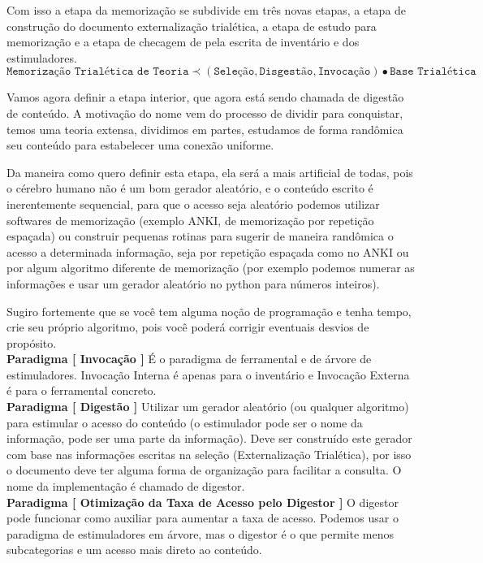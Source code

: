 Com isso a etapa da memorização se subdivide em três novas etapas, a etapa de construção do documento externalização trialética, a etapa de estudo para memorização e a etapa de checagem de pela escrita de inventário e dos estimuladores.
$$ \texttt{Memorização Trialética de Teoria} \prec (\texttt{Seleção}, \texttt{Disgestão}, \texttt{Invocação}) \bullet \texttt{Base Trialética} $$

Vamos agora definir a etapa interior, que agora está sendo chamada de digestão de conteúdo. A motivação do nome vem do processo de dividir para conquistar, temos uma teoria extensa, dividimos em partes, estudamos de forma randômica seu conteúdo para estabelecer uma conexão uniforme.

Da maneira como quero definir esta etapa, ela será a mais artificial de todas, pois o cérebro humano não é um bom gerador aleatório, e o conteúdo escrito é inerentemente sequencial, para que o acesso seja aleatório podemos utilizar softwares de memorização (exemplo ANKI, de memorização por repetição espaçada) ou construir pequenas rotinas para sugerir de maneira randômica o acesso a determinada informação, seja por repetição espaçada como no ANKI ou por algum algoritmo diferente de memorização (por exemplo podemos numerar as informações e usar um gerador aleatório no python para números inteiros).

Sugiro fortemente que se você tem alguma noção de programação e tenha tempo, crie seu próprio algoritmo, pois você poderá corrigir eventuais desvios de propósito. \\

\textbf{Paradigma [ Invocação ]} É o paradigma de ferramental e de árvore de estimuladores. Invocação Interna é apenas para o inventário e Invocação Externa é para o ferramental concreto. \\

\textbf{Paradigma [ Digestão ]} Utilizar um gerador aleatório (ou qualquer algoritmo) para estimular o acesso do conteúdo (o estimulador pode ser o nome da informação, pode ser uma parte da informação). Deve ser construído este gerador com base nas informações escritas na seleção (Externalização Trialética), por isso o documento deve ter alguma forma de organização para facilitar a consulta. O nome da implementação é chamado de digestor. \\

\textbf{Paradigma [ Otimização da Taxa de Acesso pelo Digestor ]} O digestor pode funcionar como auxiliar para aumentar a taxa de acesso. Podemos usar o paradigma de estimuladores em árvore, mas o digestor é o que permite menos subcategorias e um acesso mais direto ao conteúdo.\\

